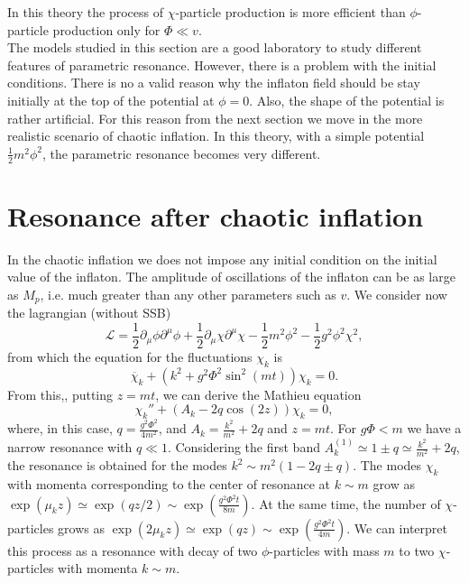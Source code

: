 \documentclass[11pt,a4paper,twoside]{book}
\begin{document}
In this theory the process of $ \chi $-particle production is more efficient than $\phi$-particle production only for $ \Phi \ll v $.\\
The models studied in this section are a good laboratory to study different features of parametric resonance. However, there is a problem with the initial conditions. There is no a valid reason why the inflaton field should be stay initially at the top of the potential at $ \phi=0 $. Also, the shape of the potential is rather artificial. For this reason from the next section we move in the more realistic scenario of chaotic inflation. In this theory, with a simple potential $ \frac{1}{2}m^{2}\phi^{2} $, the parametric resonance becomes very different.
 \section{Resonance after chaotic inflation}
 In the chaotic inflation we does not impose any initial condition on the initial value of the inflaton. The amplitude  of oscillations of the inflaton can be as large as $ M_{p} $, i.e. much greater than any other parameters such as $ v $. We consider now the lagrangian (without SSB)
 \begin{equation}
 	\label{Chap4:potentialChaoticInflation}
 	\mathcal{L}=\frac{1}{2}\partial_{\mu}\phi\partial^{\mu}\phi + \frac{1}{2}\partial_{\mu}\chi\partial^{\mu}\chi - \frac{1}{2}m^{2}\phi^{2} - \frac{1}{2}g^{2}\phi^{2}\chi^{2},
 \end{equation}
from which the equation for the fluctuations $ \chi_{k} $ is
 \begin{equation}
 	\label{Chap4:eqFluctuationChaoticModel}
 	\ddot{\chi_{k}} + (k^{2} + g^{2}\Phi^{2}\sin^{2}(mt))\chi_{k}=0.
 \end{equation}
From this,, putting $ z=mt $, we can derive the Mathieu equation 
\begin{equation}
	\label{Chap4:eqMotionChi}
	\chi_{k}'' + (A_{k} - 2q\cos(2z))\chi_{k}=0,
\end{equation}
where, in this case, $ q=\frac{g^{2}\Phi^{2}}{4m^{2}} $, and $ A_{k} = \frac{k^{2}}{m^{2}} + 2q  $ and $ z=mt $. For $ g\Phi < m $ we have a narrow resonance with $ q \ll 1 $. Considering the first band $ A_{k}^{(1)}\simeq 1\pm q \simeq \frac{k^{2}}{m^{2}} + 2q $, the resonance is obtained for the modes $ k^{2}\sim m^{2}(1-2q \pm q) $. The modes $\chi_{k}$ with momenta corresponding  to the center of resonance at $ k \sim m $ grow as $\exp(\mu_{k}z)\simeq \exp(qz/2)\sim \exp(\frac{g^{2}\Phi^{2}t}{8m})$. At the same time, the number of $\chi$-particles grows as $\exp(2\mu_{k}z) \simeq\exp(qz) \sim \exp(\frac{g^{2}\Phi^{2}t}{4m})$. We can interpret this process as a resonance with decay of two $ \phi $-particles with mass $ m $ to two $\chi$-particles with momenta $ k\sim m $.\\
\end{document}
